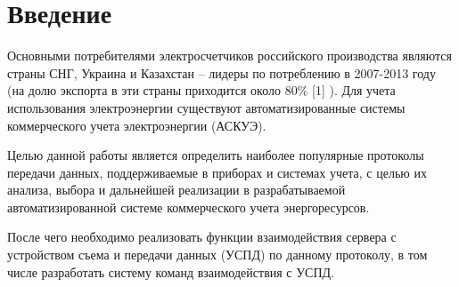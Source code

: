 \newpage

\section{Введение}

Основными  потребителями  электросчетчиков российского производства являются страны СНГ, Украина и Казахстан – лидеры по потреблению в 2007-2013 году (на долю экспорта в эти страны приходится около  80\% [1] ). Для учета использования электроэнергии существуют автоматизированные системы коммерческого учета электроэнергии (АСКУЭ).

Целью данной работы является определить наиболее популярные протоколы передачи данных, поддерживаемые в приборах и системах учета, с целью их анализа, выбора и дальнейшей реализации в разрабатываемой автоматизированной системе коммерческого учета энергоресурсов.

После чего необходимо реализовать функции взаимодействия сервера с устройством съема и передачи данных (УСПД) по данному протоколу, в том числе разработать систему команд взаимодействия с УСПД.